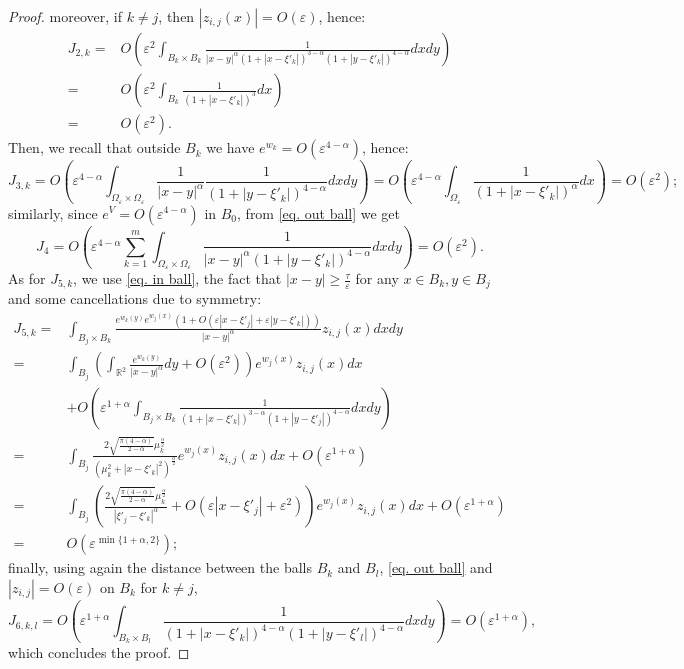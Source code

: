 \documentclass[10pt,a4paper]{amsart}
\begin{document}
\begin{proof}
moreover, if $k\ne j$, then $|z_{i,j}(x)|=O(\varepsilon)$, hence:
\begin{align*}
J_{2,k}=&O\left(\varepsilon^2\int_{B_k\times B_k}\frac1{|x-y|^\alpha\left(1+\left|x-\xi'_k\right|\right)^{3-\alpha}\left(1+\left|y-\xi'_k\right|\right)^{4-\alpha}}dxdy\right)\\
=&O\left(\varepsilon^2\int_{B_k}\frac1{\left(1+\left|x-\xi'_k\right|\right)^3}dx\right)\\
=&O\left(\varepsilon^2\right).
\end{align*}
Then, we recall that outside $B_k$ we have $e^{w_k}=O\left(\varepsilon^{4-\alpha}\right)$, hence:
$$J_{3,k}=O\left(\varepsilon^{4-\alpha}\int_{\Omega_\varepsilon\times\Omega_\varepsilon}\frac1{|x-y|^\alpha}\frac1{\left(1+\left|y-\xi'_k\right|\right)^{4-\alpha}}dxdy\right)=O\left(\varepsilon^{4-\alpha}\int_{\Omega_\varepsilon}\frac1{\left(1+\left|x-\xi'_k\right|\right)^\alpha}dx\right)=O\left(\varepsilon^2\right);$$
similarly, since $e^V=O\left(\varepsilon^{4-\alpha}\right)$ in $B_0$, from \eqref{eq. out ball} we get
$$J_4=O\left(\varepsilon^{4-\alpha}\sum_{k=1}^m\int_{\Omega_\varepsilon\times\Omega_\varepsilon}\frac1{|x-y|^\alpha\left(1+\left|y-\xi'_k\right|\right)^{4-\alpha}}dxdy\right)=O\left(\varepsilon^2\right).$$
As for $J_{5,k}$, we use \eqref{eq. in ball}, the fact that $|x-y|\ge\frac\tau\varepsilon$ for any $x\in B_k,y\in B_j$ and some cancellations due to symmetry:
\begin{align*}
J_{5,k}=&\int_{B_j\times B_k}\frac{e^{w_k(y)}e^{w_j(x)}\left(1+O\left(\varepsilon\left|x-\xi'_j\right|+\varepsilon\left|y-\xi'_k\right|\right)\right)}{|x-y|^\alpha}z_{i,j}(x)dxdy\\
=&\int_{B_j}\left(\int_{\mathbb R^2}\frac{e^{w_k(y)}}{|x-y|^\alpha}dy+O\left(\varepsilon^2\right)\right)e^{w_j(x)}z_{i,j}(x)dx\\
&+O\left(\varepsilon^{1+\alpha}\int_{B_j\times B_k}\frac1{\left(1+\left|x-\xi'_k\right|\right)^{3-\alpha}\left(1+\left|y-\xi'_j\right|\right)^{4-\alpha}}dxdy\right)\\
=&\int_{B_j}\frac{2\sqrt{\frac{\pi(4-\alpha)}{2-\alpha}}\mu_k^\frac\alpha2}{\left(\mu_k^2+\left|x-\xi'_k\right|^2\right)^{\frac\alpha2}}e^{w_j(x)}z_{i,j}(x)dx+O\left(\varepsilon^{1+\alpha}\right)\\
=&\int_{B_j}\left(\frac{2\sqrt{\frac{\pi(4-\alpha)}{2-\alpha}}\mu_k^\frac\alpha2}{\left|\xi'_j-\xi'_k\right|^\alpha}+O\left(\varepsilon\left|x-\xi'_j\right|+\varepsilon^2\right)\right)e^{w_j(x)}z_{i,j}(x)dx+O\left(\varepsilon^{1+\alpha}\right)\\
=&O\left(\varepsilon^{\min\{1+\alpha,2\}}\right);
\end{align*}
finally, using again the distance between the balls $B_k$ and $B_l$, \eqref{eq. out ball} and $|z_{i,j}|=O(\varepsilon)$ on $B_k$ for $k\ne j$,
$$J_{6,k,l}=O\left(\varepsilon^{1+\alpha}\int_{B_k\times B_l}\frac1{\left(1+\left|x-\xi'_k\right|\right)^{4-\alpha}\left(1+\left|y-\xi'_l\right|\right)^{4-\alpha}}dxdy\right)=O\left(\varepsilon^{1+\alpha}\right),$$
which concludes the proof.
\end{proof}\
\end{document}
